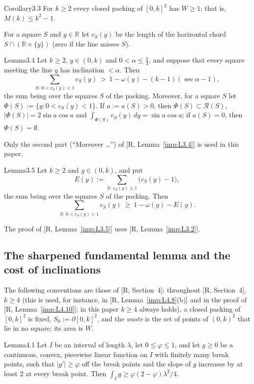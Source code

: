 \documentclass[11pt]{amsart}
\newcommand{\R}{\mathbb R}
\theoremstyle{definition}
\theoremstyle{remark}
\numberwithin{equation}{section}
\begin{document}
\begin{ImpStatement}{Corollary}{3.3}\label{imp:C3.3}
For $k\ge2$ every closed packing of $[0,k]^2$ has $W\ge1$; that is, $M(k)\le k^2-1$.
\end{ImpStatement}

For a square $S$ and $y\in\R$ let $c_S(y)$ be the length of the horizontal chord $S\cap(\R\times\{y\})$ (zero if the line
misses $S$).

\begin{ImpStatement}{Lemma}{3.4}\label{imp:L3.4}
Let $k\ge 2$, $y\in(0,k)$ and $0<\alpha\le\frac\pi4$, and suppose that every square meeting the line $y$ has inclination
$<\alpha$. Then
\[
\sum_{S:\ 0<c_S(y)<1}c_S(y)\ >\ 1-\omega(y)-(k-1)(\sec\alpha-1),
\]
the sum being over the squares $S$ of the packing. Moreover, for a square $S$ let $\Phi(S):=\{y:0<c_S(y)<1\}$. If
$a:=a(S)>0$, then $\Phi(S)\subset\mathcal R(S)$, $|\Phi(S)|=2\sin a\cos a$ and $\int_{\Phi(S)}c_S(y)\,dy=\sin a\cos a$; if $a(S)=0$, then
$\Phi(S)=\emptyset$.
\end{ImpStatement}

Only the second part (``Moreover \dots'') of [R, Lemma~\ref{imp:L3.4}] is used in this paper.

\begin{ImpStatement}{Lemma}{3.5}\label{imp:L3.5}
Let $k\ge2$ and $y\in(0,k)$, and put
\[
E(y):=\sum_{S:\ c_S(y)\ge1}\big(c_S(y)-1\big),
\]
the sum being over the squares $S$ of the packing. Then
\[
\sum_{S:\ 0<c_S(y)<1}c_S(y)\ \ge\ 1-\omega(y)-E(y).
\]
\end{ImpStatement}

The proof of [R, Lemma~\ref{imp:L3.5}] uses [R, Lemma~\ref{imp:L3.2}].

\subsection{The sharpened fundamental lemma and the cost of inclinations}

The following conventions are those of [R, Section~4]:
throughout [R, Section~4], $k\ge4$ (this is used, for instance, in [R, Lemma~\ref{imp:L4.8}(b)] and in the proof of
[R, Lemma~\ref{imp:L4.10}]; in this paper $k\ge4$ always holds), a closed packing of $[0,k]^2$ is fixed,
$S_0:=\partial[0,k]^2$, and the \emph{waste} is the set of points of $(0,k)^2$ that lie in no square; its area is $W$.

\begin{ImpStatement}{Lemma}{4.1}\label{imp:L4.1}
Let $I$ be an interval of length $\lambda$, let $0\le\varphi\le1$, and let $g\ge0$ be a continuous, convex, piecewise linear
function on $I$ with finitely many break points, such that $|g'|\ge\varphi$ off the break points and the slope of $g$
increases by at least $2$ at every break point. Then $\int_Ig\ge\varphi(2-\varphi)\lambda^2/4$.
\end{ImpStatement}
\end{document}
